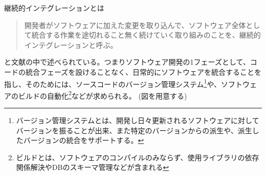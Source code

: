 継続的インテグレーションとは

\begin{quote}

  開発者がソフトウェアに加えた変更を取り込んで、ソフトウェア全体として統合する作業を途切れること無く続けていく取り組みのことを、継続的インテグレーションと呼ぶ。

\end{quote}

と文献\cite{西村直人2011アジャイルサムライ}の中で述べられている。つまりソフトウェア開発の1フェーズとして、コードの統合フェーズを設けることなく、日常的にソフトウェアを統合することを指し、そのためには、ソースコードのバージョン管理システム\footnote{バージョン管理システムとは、開発し日々更新されるソフトウェアに対してバージョンを振ることが出来、また特定のバージョンからの派生や、派生したバージョンの統合をサポートする。}や、ソフトウェアのビルドの自動化\footnote{ビルドとは、ソフトウェアのコンパイルのみならず、使用ライブラリの依存関係解決やDBのスキーマ管理などが含まれる}などが求められる。 (図を用意する)

